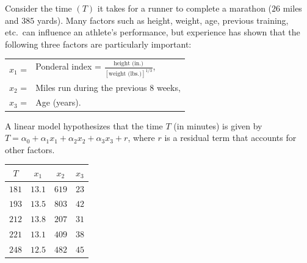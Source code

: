 \documentclass[answers,10pt]{exam}
\begin{document}
\begin{questions}
\question [10] Consider the time $(T)$ it takes for a runner to complete a marathon ($26$ miles and $385$ yards). Many factors such as height, weight, age, previous training, etc.\ can influence an athlete's performance, but experience has shown that the following three factors are particularly important:
\begin{center}
\begin{tabular}{ll}
$x_1$ = & Ponderal index  = $\frac{\text{height (in.)}}{[\text{weight (lbs.)}]^{1/3}}$, \\
$x_2$ = & Miles run during  the  previous $8$ weeks,\\ 
$x_3$ = & Age (years).
\end{tabular}
\end{center}
A linear model hypothesizes that the time $T$ (in minutes) is given by $T = \alpha_0 +\alpha_1x_1 +\alpha_2x_2 +\alpha_3x_3 +r$, where $r$ is a residual term that accounts for other factors.
\begin{center}
\begin{tabular}{c|ccc}
$T$ & $x_1$ & $x_2$ & $x_3$ \\ \hline
$181$ &  $13.1$ & $619$ & $23$ \\
$193$ & $13.5$ & $803$ & $42$ \\ 
$212$ & $13.8$ & $207$ & $31$ \\ 
$221$ & $13.1$ & $409$ & $38$ \\
$248$ & $12.5$ & $482$ & $45$
\end{tabular}
\end{center}


\end{questions}
\end{document}
